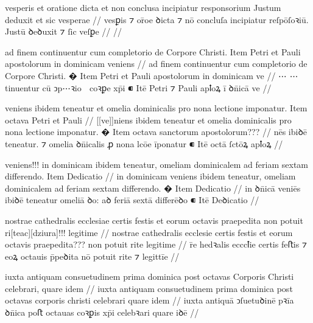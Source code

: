 \ex \bg
\gla
{}
vesperis
et oratione dicta et non conclusa incipiatur responsorium Justum deduxit et sic vesperae
//
\glRekonstrukcja
{}
vesꝑis ⁊ or̄oe ꝺicta ⁊ nō concluſa incipiatur reſpōſoꝛiū. Justū ꝺeꝺuxit ⁊ ſic veſꝑe
//
\glU
{}
//
\endgl
\eg



\ex \bg
\gla
{}
ad finem continuentur cum completorio de Corpore Christi.
{} Item Petri et Pauli apostolorum in dominicam veniens
//
\glRekonstrukcja
{}
ad finem continuentur cum completorio de Corpore Christi.
� Item Petri et Pauli apostolorum in dominicam ve
//
\glU
{}
⋯ ⋯ tinuentur cū ↄp⋯ꝛio  coꝛꝑe xp̄i ⁌ Itē Petri ⁊ Pauli apꝉoꝝ ī ꝺn̄icā ve
//
\endgl
\eg



\ex \bg
\gla
{}
veniens ibidem
teneatur et omelia dominicalis pro nona lectione imponatur.
{} Item octava Petri et Pauli {} {}
//
\glRekonstrukcja
{}
[[ve]]niens ibidem
teneatur et omelia dominicalis pro nona lectione imponatur.
� Item octava {} {} {} sanctorum apostolorum???
//
\glU
{}
nēs ibiꝺē teneatur. ⁊ omelia ꝺn̄icalis ꝓ nona lcōe īponatur ⁌ Itē octā {} {} {} ſctōꝝ apꝉoꝝ
//
\endgl
\eg



\ex \bg
\gla
{}
veniens!!! in dominicam {} ibidem teneatur,
omeliam dominicalem ad feriam sextam differendo.
{} Item Dedicatio
//
\glRekonstrukcja
{}
{} in dominicam  veniens ibidem teneatur,
omeliam dominicalem ad feriam sextam differendo.
� Item Dedicatio
//
\glU
{}
{} in ꝺn̄icā  veniēs ibiꝺē teneatur omeliā ꝺo: aꝺ feriā sextā diﬀerēꝺo ⁌ Itē Deꝺicatio
//
\endgl
\eg



\ex \bg
\gla
{}
nostrae cathedralis ecclesiae certis festis et eorum
octavis praepedita non potuit ri[teac][dziura]!!! legitime
//
\glRekonstrukcja
{}
nostrae cathedralis ecclesie certis festis et eorum
octavis praepedita??? non potuit rite {} legitime
//
\glU
{}
r̄e hedꝛalis ecccꝉie certis feﬅis ⁊ eoꝝ octauis p̄peꝺita nō potuit rite ⁊ legittīe
//
\endgl
\eg



\ex \bg
\gla
{}
iuxta antiquam consuetudinem prima dominica post octavas Corporis Christi celebrari, quare
idem
//
\glRekonstrukcja
{}
iuxta antiquam consuetudinem prima dominica post octavas corporis christi celebrari quare
idem
//
\glU
{}
iuxta antiquā ↄſuetuꝺinē pꝛīa ꝺn̄ica poﬅ octauas coꝛꝑis xp̄i celebꝛari quare iꝺē
//
\endgl
\eg



